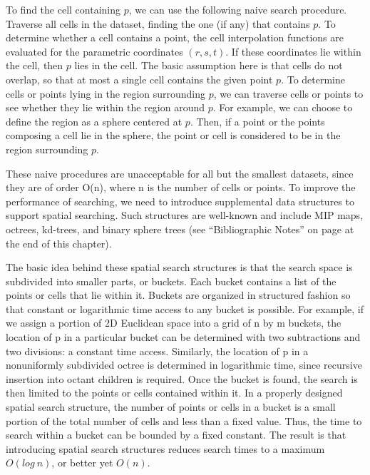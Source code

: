 To find the cell containing $p$, we can use the following naive search procedure.
Traverse all cells in the dataset, finding the one (if any) that contains $p$.
To determine whether a cell contains a point, the cell interpolation functions are evaluated for the parametric coordinates $(r,s,t)$.
If these coordinates lie within the cell, then $p$ lies in the cell.
The basic assumption here is that cells do not overlap, so that at most a single cell contains the given point $p$.
To determine cells or points lying in the region surrounding $p$, we can traverse cells or points to see whether they lie within the region around $p$.
For example, we can choose to define the region as a sphere centered at $p$.
Then, if a point or the points composing a cell lie in the sphere, the point or cell is considered to be in the region surrounding $p$.

These naive procedures are unacceptable for all but the smallest datasets, since they are of order O(n), where n is the number of cells or points. To improve the performance of searching, we need to introduce supplemental data structures to support spatial searching. Such structures are well-known and include MIP maps, octrees, kd-trees, and binary sphere trees (see ``Bibliographic Notes'' on page \pageref{bibnote:advanced_data_representation} at the end of this chapter).

The basic idea behind these spatial search structures is that the search space is subdivided into smaller parts, or buckets. Each bucket contains a list of the points or cells that lie within it. Buckets are organized in structured fashion so that constant or logarithmic time access to any bucket is possible. For example, if we assign a portion of 2D Euclidean space into a grid of n by m buckets, the location of p in a particular bucket can be determined with two subtractions and two divisions: a constant time access. Similarly, the location of p in a nonuniformly subdivided octree is determined in logarithmic time, since recursive insertion into octant children is required. Once the bucket is found, the search is then limited to the points or cells contained within it. In a properly designed spatial search structure, the number of points or cells in a bucket is a small portion of the total number of cells and less than a fixed value. Thus, the time to search within a bucket can be bounded by a fixed constant. The result is that introducing spatial search structures reduces search times to a maximum $O(log\: n)$, or better yet $O(n)$.

